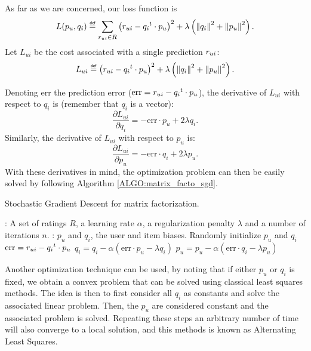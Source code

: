 As far as we are concerned, our loss function is
$$
L(p_u, q_i) \eqdef \sum_{\rui \in R} \left(\rui - {q_i}^t \cdot p_u \right)^2 +
\lambda\left(\norm{}{q_i}^2 + \norm{}{p_u}^2\right).
$$
Let $L_{ui}$ be the cost associated with a single prediction $r_{ui}$: $$L_{ui}
\eqdef \left(\rui - {q_i}^t \cdot p_u \right)^2 + \lambda\left(\norm{}{q_i}^2 +
\norm{}{p_u}^2\right).$$

Denoting err the prediction error ($\text{err} = r_{ui} - {q_i}^t \cdot p_u$), the
derivative of $L_{ui}$ with respect to $q_i$ is (remember that $q_i$ is a
vector):
$$\frac{\partial L_{ui}}{\partial q_i} = -\text{err} \cdot p_u + 2\lambda
q_i.$$
Similarly, the derivative of $L_{ui}$ with respect to $p_u$ is:
$$\frac{\partial L_{ui}}{\partial p_u} = -\text{err} \cdot q_i + 2\lambda
p_u.$$
With these derivatives in mind, the optimization problem can then be easily
solved by following Algorithm \ref{ALGO:matrix_facto_sgd}.

\begin{algorithm}[!ht]
 \caption{Stochastic Gradient Descent for matrix factorization.}
       \label{ALGO:matrix_facto_sgd}
       \begin{algorithmic}

         : A set of ratings $R$, a learning rate $\alpha$, a
         regularization penalty $\lambda$ and a number of iterations $n$.
         : $p_u$ and $q_i$, the user and item biases.
         \STATE Randomly initialize $p_u$ and $q_i$
         \STATE $\text{err} = r_{ui} - {q_i}^t \cdot p_u$
         \STATE $q_i = q_i - \alpha (\text{err} \cdot p_u - \lambda q_i)$
         \STATE $p_u = p_u - \alpha (\text{err} \cdot q_i - \lambda p_u)$
         \ENDFOR
         \ENDFOR
\end{algorithmic}
\end{algorithm}

Another optimization technique can be used, by noting that if either $p_u$ or
$q_i$ is fixed, we obtain a convex problem that can be solved using
classical least squares methods. The idea is then to first consider all $q_i$
as constants and solve the associated linear problem. Then, the $p_u$ are
considered constant and the associated problem is solved. Repeating these steps
an arbitrary number of time will also converge to a local solution, and this
methods is known as Alternating Least Squares.


